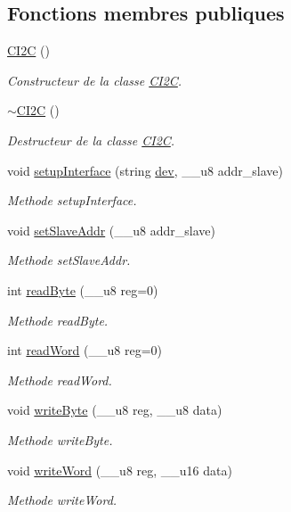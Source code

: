 \subsection*{Fonctions membres publiques}
\begin{DoxyCompactItemize}
\item 
\hyperlink{class_c_i2_c_a2df83a2627a8b8bf91460a68372c9ed5}{C\+I2\+C} ()
\begin{DoxyCompactList}\small\item\em Constructeur de la classe \hyperlink{class_c_i2_c}{C\+I2\+C}. \end{DoxyCompactList}\item 
\hyperlink{class_c_i2_c_ae757710bb84ab327217092f0af851a16}{$\sim$\+C\+I2\+C} ()
\begin{DoxyCompactList}\small\item\em Destructeur de la classe \hyperlink{class_c_i2_c}{C\+I2\+C}. \end{DoxyCompactList}\item 
void \hyperlink{class_c_i2_c_a8fe8755470906582ab854edcbf2a2992}{setup\+Interface} (string \hyperlink{class_c_i2_c_ae2d4648eadc2acae86a49cecbf39ce56}{dev}, \+\_\+\+\_\+u8 addr\+\_\+slave)
\begin{DoxyCompactList}\small\item\em Methode setup\+Interface. \end{DoxyCompactList}\item 
void \hyperlink{class_c_i2_c_ae766fc56ba88f9063e86412fca0c1dfc}{set\+Slave\+Addr} (\+\_\+\+\_\+u8 addr\+\_\+slave)
\begin{DoxyCompactList}\small\item\em Methode set\+Slave\+Addr. \end{DoxyCompactList}\item 
int \hyperlink{class_c_i2_c_afb589b9bdefa75257807b4e6ac2c1c5a}{read\+Byte} (\+\_\+\+\_\+u8 reg=0)
\begin{DoxyCompactList}\small\item\em Methode read\+Byte. \end{DoxyCompactList}\item 
int \hyperlink{class_c_i2_c_a283d5f6d8371e2abb6532b9e32392f9a}{read\+Word} (\+\_\+\+\_\+u8 reg=0)
\begin{DoxyCompactList}\small\item\em Methode read\+Word. \end{DoxyCompactList}\item 
void \hyperlink{class_c_i2_c_a26517fc7e3a282863ff09e7a792f4386}{write\+Byte} (\+\_\+\+\_\+u8 reg, \+\_\+\+\_\+u8 data)
\begin{DoxyCompactList}\small\item\em Methode write\+Byte. \end{DoxyCompactList}\item 
void \hyperlink{class_c_i2_c_a14250174d9281db1bc1db2360cacee40}{write\+Word} (\+\_\+\+\_\+u8 reg, \+\_\+\+\_\+u16 data)
\begin{DoxyCompactList}\small\item\em Methode write\+Word. \end{DoxyCompactList}\end{DoxyCompactItemize}
